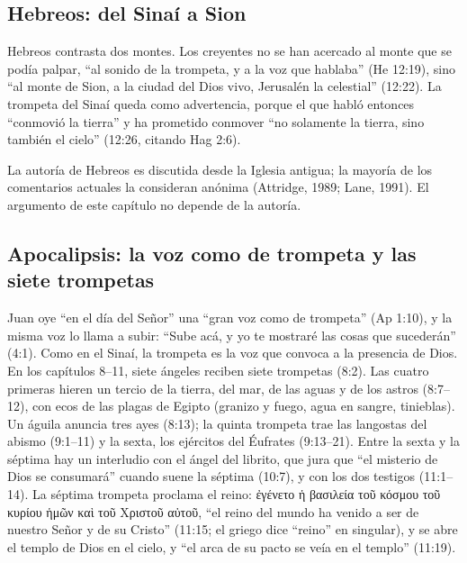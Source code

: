 \documentclass[11pt,letterpaper]{article}
\newcommand{\grc}[1]{\foreignlanguage{ancientgreek}{#1}}
\begin{document}
\subsection{Hebreos: del Sinaí a Sion}
Hebreos contrasta dos montes. Los creyentes no se han acercado al monte que se podía palpar, ``al sonido de la trompeta, y a la voz que hablaba'' (He 12:19), sino ``al monte de Sion, a la ciudad del Dios vivo, Jerusalén la celestial'' (12:22). La trompeta del Sinaí queda como advertencia, porque el que habló entonces ``conmovió la tierra'' y ha prometido conmover ``no solamente la tierra, sino también el cielo'' (12:26, citando Hag 2:6).

\begin{nota}
La autoría de Hebreos es discutida desde la Iglesia antigua; la mayoría de los comentarios actuales la consideran anónima (Attridge, 1989; Lane, 1991). El argumento de este capítulo no depende de la autoría.
\end{nota}

\subsection{Apocalipsis: la voz como de trompeta y las siete trompetas}
Juan oye ``en el día del Señor'' una ``gran voz como de trompeta'' (Ap 1:10), y la misma voz lo llama a subir: ``Sube acá, y yo te mostraré las cosas que sucederán'' (4:1). Como en el Sinaí, la trompeta es la voz que convoca a la presencia de Dios. En los capítulos 8--11, siete ángeles reciben siete trompetas (8:2). Las cuatro primeras hieren un tercio de la tierra, del mar, de las aguas y de los astros (8:7--12), con ecos de las plagas de Egipto (granizo y fuego, agua en sangre, tinieblas). Un águila anuncia tres ayes (8:13); la quinta trompeta trae las langostas del abismo (9:1--11) y la sexta, los ejércitos del Éufrates (9:13--21). Entre la sexta y la séptima hay un interludio con el ángel del librito, que jura que ``el misterio de Dios se consumará'' cuando suene la séptima (10:7), y con los dos testigos (11:1--14). La séptima trompeta proclama el reino: \grc{ἐγένετο ἡ βασιλεία τοῦ κόσμου τοῦ κυρίου ἡμῶν καὶ τοῦ Χριστοῦ αὐτοῦ}, ``el reino del mundo ha venido a ser de nuestro Señor y de su Cristo'' (11:15; el griego dice ``reino'' en singular), y se abre el templo de Dios en el cielo, y ``el arca de su pacto se veía en el templo'' (11:19).
\end{document}
